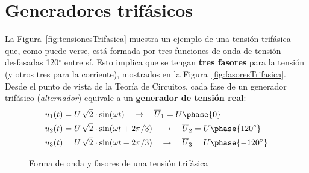 	
	\section{Generadores trifásicos}
	La Figura~\ref{fig:tensionesTrifasica} muestra un ejemplo de una tensión trifásica que, como puede verse, está formada por tres funciones de onda de tensión desfasadas 120$^\circ$ entre sí. Esto implica que se tengan \textbf{tres fasores} para la tensión (y otros tres para la corriente), mostrados en la Figura~\ref{fig:fasoresTrifasica}.  Desde el punto de vista de la Teoría de Circuitos, cada fase de un generador trifásico (\textit{alternador}) equivale a un \textbf{generador de tensión real}:
	\begin{align*}
		u_1(t) &= U\,\sqrt{2}\cdot \sin(\omega t) \quad\rightarrow\quad  \overline{U}_1 = U\phase{0}\\
		u_2(t) &= U\,\sqrt{2} \cdot\sin(\omega t + 2\pi/3) \quad\rightarrow\quad  \overline{U}_2 = U\phase{120^\circ}\\
		u_3(t) &= U\,\sqrt{2}\cdot \sin(\omega t - 2\pi/3) \quad\rightarrow\quad  \overline{U}_3 = U\phase{-120^\circ}
	\end{align*}
	\begin{figure}
		\centering
		 \hfill
		\caption{Forma de onda y fasores de una tensión trifásica}
		\label{fig:tensiontrifasica}
	\end{figure}
